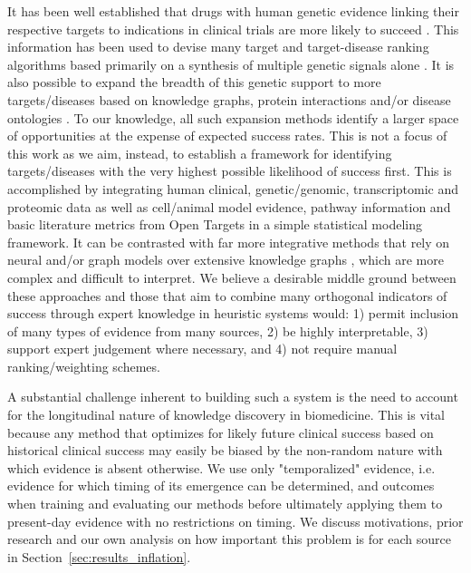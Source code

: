 \documentclass{article}
\begin{document}
It has been well established that drugs with human genetic evidence linking their respective targets to indications in clinical trials are more likely to succeed \cite{Nelson2015-eg,King2019-rc,Minikel2023.06.23.23291765,Razuvayevskaya2023.02.07.23285407,PMID:30652614,PMID:24833294,PMID:35804044,PMID:36963162}. This information has been used to devise many target and target-disease ranking algorithms based primarily on a synthesis of multiple genetic signals alone \cite{PMID:38172303,Koscielny2017-rr,PMID:31253980}. It is also possible to expand the breadth of this genetic support to more targets/diseases based on knowledge graphs, protein interactions and/or disease ontologies \cite{PMID:33262371,Bao2022-bq,Sadler2023-xd,PMID:36087372,PMID:36823319}. To our knowledge, all such expansion methods identify a larger space of opportunities at the expense of expected success rates. This is not a focus of this work as we aim, instead, to establish a framework for identifying targets/diseases with the very highest possible likelihood of success first. This is accomplished by integrating human clinical, genetic/genomic, transcriptomic and proteomic data as well as cell/animal model evidence, pathway information and basic literature metrics from Open Targets \cite{Koscielny2017-rr} in a simple statistical modeling framework. It can be contrasted with far more integrative methods that rely on neural and/or graph models over extensive knowledge graphs \cite{Paliwal2020-hr,PMID:33741907,pittala2020relationweighted,PMID:32750869}, which are more complex and difficult to interpret. We believe a desirable middle ground between these approaches and those that aim to combine many orthogonal indicators of success through expert knowledge in heuristic systems \cite{PMID:38404138,Koscielny2017-rr} would: 1) permit inclusion of many types of evidence from many sources, 2) be highly interpretable, 3) support expert judgement where necessary, and 4) not require manual ranking/weighting schemes.

A substantial challenge inherent to building such a system is the need to account for the longitudinal nature of knowledge discovery in biomedicine. This is vital because any method that optimizes for likely future clinical success based on historical clinical success may easily be biased by the non-random nature with which evidence is absent otherwise. We use only "temporalized" evidence, i.e. evidence for which timing of its emergence can be determined, and outcomes when training and evaluating our methods before ultimately applying them to present-day evidence with no restrictions on timing. We discuss motivations, prior research and our own analysis on how important this problem is for each source in Section~\ref{sec:results_inflation}.
\end{document}
